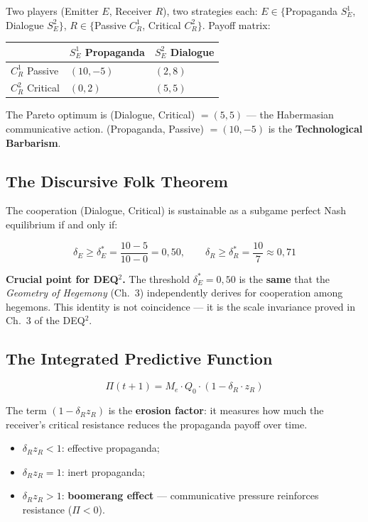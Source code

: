 Two players (Emitter \(E\), Receiver \(R\)), two strategies each:
\(E \in \{\)Propaganda \(S^1_E\), Dialogue \(S^2_E\}\),
\(R \in \{\)Passive \(C^1_R\), Critical \(C^2_R\}\). Payoff matrix:

{\def\LTcaptype{none} %
{\small\begin{longtable}[]{@{}lll@{}}
\toprule\noalign{}
& \(S^1_E\) Propaganda & \(S^2_E\) Dialogue \\
\midrule\noalign{}
\endhead
\bottomrule\noalign{}
\endlastfoot
\(C^1_R\) Passive & \((10, -5)\) & \((2, 8)\) \\
\(C^2_R\) Critical & \((0, 2)\) & \((5, 5)\) \\
\end{longtable}}
}

The Pareto optimum is (Dialogue, Critical) \(= (5, 5)\) --- the
Habermasian communicative action. (Propaganda, Passive) \(= (10, -5)\)
is the \textbf{Technological Barbarism}.

\subsection{The Discursive Folk
Theorem}\label{discursive-folk-theorem}

\Proved{} The cooperation (Dialogue, Critical) is sustainable as a
subgame perfect Nash equilibrium if and only if:

\[
\delta_E \geq \delta^*_E = \frac{10 - 5}{10 - 0} = 0{,}50, \qquad \delta_R \geq \delta^*_R = \frac{10}{7} \approx 0{,}71
\]

\Hypoth{} \textbf{Crucial point for DEQ$^2$.} The threshold
\(\delta^*_E = 0{,}50\) is the \textbf{same} that the \emph{Geometry of
Hegemony} (Ch.~3) independently derives for cooperation among hegemons.
This identity is not coincidence --- it is the scale invariance proved in
Ch.~3 of the DEQ$^2$.

\subsection{The Integrated Predictive
Function}\label{integrated-predictive-function}

\[
\boxed{\Pi(t+1) = M_e \cdot Q_0 \cdot (1 - \delta_R \cdot z_R)}
\]

The term \((1 - \delta_R z_R)\) is the \textbf{erosion factor}: it
measures how much the receiver's critical resistance reduces the
propaganda payoff over time.

\begin{itemize}
\tightlist
\item
  \(\delta_R z_R < 1\): effective propaganda;
\item
  \(\delta_R z_R = 1\): inert propaganda;
\item
  \(\delta_R z_R > 1\): \textbf{boomerang effect} --- communicative
  pressure reinforces resistance (\(\Pi < 0\)).
\end{itemize}

